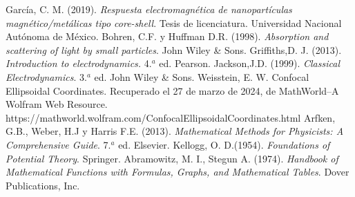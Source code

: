 \documentclass[paper=letter, fontsize=12pt,]{article}
\begin{document}
\begin{thebibliography}{99}
 García, C. M. (2019). \textit{Respuesta electromagnética de nanopartículas magnético/metálicas tipo core-shell}. Tesis de licenciatura. Universidad Nacional Autónoma de México.
Bohren, C.F. y  Huffman D.R.  (1998). \textit{Absorption and scattering of light by small particles}. John Wiley \& Sons.
Griffiths,D. J.  (2013). \textit{Introduction to electrodynamics.} 4.$^a$ ed. Pearson.
Jackson,J.D.  (1999). \textit{Classical Electrodynamics}. 3.$^a$ ed.  John Wiley \& Sons.
 Weisstein, E. W. Confocal Ellipsoidal Coordinates. Recuperado el 27 de marzo de 2024, de MathWorld--A Wolfram Web Resource. https://mathworld.wolfram.com/ConfocalEllipsoidalCoordinates.html
 Arfken, G.B., Weber, H.J y Harris F.E. (2013). \textit{Mathematical Methods for Physicists: A Comprehensive Guide}. 7.$^a$ ed. Elsevier.
 Kellogg, O. D.(1954). \textit{Foundations of Potential Theory}. Springer.
 Abramowitz, M. I., Stegun A. (1974). \textit{Handbook of Mathematical Functions with Formulas, Graphs, and
Mathematical Tables}. Dover Publications, Inc.
\end{thebibliography}


\end{document}
